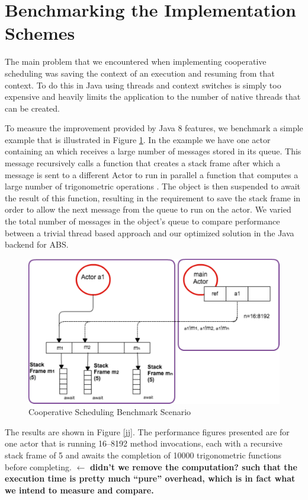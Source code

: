 \section{Benchmarking the Implementation Schemes}
\label{bench}
The main problem that we encountered  when implementing cooperative scheduling was saving the context of an execution and resuming from that context. To do this in Java using threads and context switches is simply too expensive and heavily limits the application to the number of native threads that can be created. 

To measure the improvement provided by Java 8 features, we benchmark a
simple example that is illustrated in Figure \ref{sf}. In the
example we have one actor containing an  which receives a large
number of messages stored in its queue. This message recursively calls
a function that creates a stack frame after which a message is
sent to a different Actor to run in parallel a function that computes a large number of trigonometric operations . The object is then suspended to await the
result of this function, resulting in the requirement to save the stack frame in order to allow the next message from the queue to run
on the actor.  We varied the total number
of messages in the object's queue to compare performance between a trivial thread based approach and our optimized solution in the Java backend for ABS. 

\begin{figure}
	\label{sf}
	\centering
	\includegraphics[scale=0.6]{scenario}
	\caption{Cooperative Scheduling Benchmark Scenario}
\end{figure}

\par The results are shown in
Figure \ref{jj}. The performance figures presented are for one
actor that is running 16--8192 method invocations, each with a
recursive stack frame of 5 and awaits the
completion of 10000 trigonometric functions before completing. 
$\leftarrow$ {\bfseries didn't we remove the computation? such that the execution time is pretty much ``pure'' overhead, which is in fact what we intend to measure and compare.}


